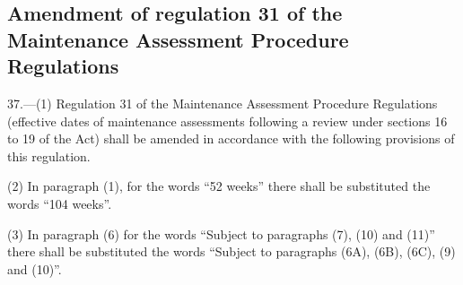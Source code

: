 \documentclass[12pt,a4paper]{article}
\begin{document}
\subsection[37. Amendment of regulation 31 of the Maintenance Assessment Procedure Regulations]{Amendment of regulation 31 of the Maintenance Assessment Procedure Regulations}

37.—(1) Regulation 31 of the Maintenance Assessment Procedure Regulations (effective dates of maintenance assessments following a review under sections 16 to 19 of the Act) shall be amended in accordance with the following provisions of this regulation.

(2) In paragraph (1), for the words “52 weeks” there shall be substituted the words “104 weeks”.

(3) In paragraph (6) for the words “Subject to paragraphs (7), (10) and (11)” there shall be substituted the words “Subject to paragraphs (6A), (6B), (6C), (9) and (10)”.
\end{document}
